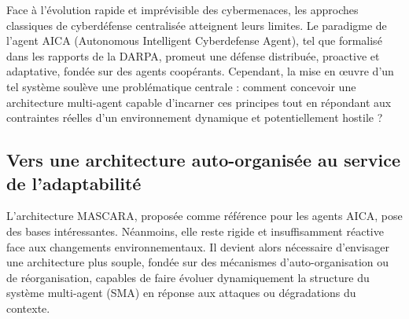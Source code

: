 \documentclass[ twoside,openright,titlepage,numbers=noenddot,headinclude,%
                footinclude=true,cleardoublepage=empty,abstractoff, %
                BCOR=5mm,paper=a4,fontsize=11pt,%
                french,american,%
                ]{scrreprt}
\begin{document}

Face à l’évolution rapide et imprévisible des cybermenaces, les approches classiques de cyberdéfense centralisée atteignent leurs limites. Le paradigme de l’agent AICA (Autonomous Intelligent Cyberdefense Agent), tel que formalisé dans les rapports de la DARPA, promeut une défense distribuée, proactive et adaptative, fondée sur des agents coopérants. Cependant, la mise en œuvre d’un tel système soulève une problématique centrale : comment concevoir une architecture multi-agent capable d’incarner ces principes tout en répondant aux contraintes réelles d’un environnement dynamique et potentiellement hostile ?

\subsection*{Vers une architecture auto-organisée au service de l’adaptabilité}

L’architecture MASCARA, proposée comme référence pour les agents AICA, pose des bases intéressantes. Néanmoins, elle reste rigide et insuffisamment réactive face aux changements environnementaux. Il devient alors nécessaire d’envisager une architecture plus souple, fondée sur des mécanismes d’auto-organisation ou de réorganisation, capables de faire évoluer dynamiquement la structure du système multi-agent (SMA) en réponse aux attaques ou dégradations du contexte.
\end{document}
